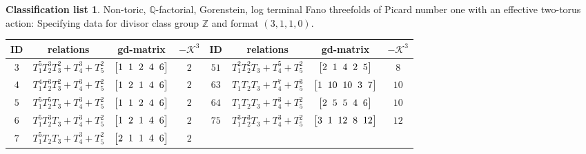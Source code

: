 \documentclass[10pt,a4paper]{amsart}
\theoremstyle{definition}
\newtheorem{class-list}[thm]{Classification list}
\def\ZZ{{\mathbb Z}}
\def\QQ{{\mathbb Q}}
\numberwithin{equation}{section}
\begin{document}
\begin{class-list}
Non-toric, $\QQ$-factorial, Gorenstein, log terminal Fano
threefolds of Picard number one with an effective two-torus action:
Specifying data for divisor class group $\ZZ$ and format $(3,1,1,0)$.
\begin{table}[h!]\centering\setlength{\tabcolsep}{3.5pt}
\renewcommand{\arraystretch}{1.25}\small\tabulinesep=1mm
\begin{tabu}{c|c|c|c||c|c|c|c}\hline
ID&relations&gd-matrix&$-\mathcal{K}^3$&ID&relations&gd-matrix&$-\mathcal{K}^3$
\\ \hline
${3}$&${T_{1}^{5}T_{2}^{3}T_{3}^{2}+T_{4}^{3}+T_{5}^{2}}$
&$\arraycolsep=1mm\begin{bmatrix} {1} & {1} & {2} & {4} & {6}\end{bmatrix}$&${2}$
&${51}$&${T_{1}^{2}T_{2}^{2}T_{3}+T_{4}^{5}+T_{5}^{2}}$
&$\arraycolsep=1mm\begin{bmatrix}{2} & {1} & {4} & {2} & {5}\end{bmatrix}$&${8}$
\\
\hline
${4}$&${T_{1}^{4}T_{2}^{3}T_{3}^{2}+T_{4}^{3}+T_{5}^{2}}$
&$\arraycolsep=1mm\begin{bmatrix}{1} & {2} & {1} & {4} & {6}\end{bmatrix}$&${2}$
&${63}$&${T_{1}T_{2}T_{3}+T_{4}^{7}+T_{5}^{3}}$
&$\arraycolsep=1mm\begin{bmatrix}{1} & {10} & {10} & {3} & {7}\end{bmatrix}$&${10}$
\\ \hline
${5}$&${T_{1}^{5}T_{2}^{5}T_{3}+T_{4}^{3}+T_{5}^{2}}$
&$\arraycolsep=1mm\begin{bmatrix}{1} & {1} & {2} & {4} & {6}\end{bmatrix}$&${2}$
&${64}$&${T_{1}T_{2}T_{3}+T_{4}^{3}+T_{5}^{2}}$
&$\arraycolsep=1mm\begin{bmatrix}{2} & {5} & {5} & {4} & {6}\end{bmatrix}$&${10}$
\\ \hline
${6}$&${T_{1}^{5}T_{2}^{3}T_{3}+T_{4}^{3}+T_{5}^{2}}$
&$\arraycolsep=1mm\begin{bmatrix}{1} & {2} & {1} & {4} & {6}\end{bmatrix}$&${2}$
&${75}$&${T_{1}^{3}T_{2}^{3}T_{3}+T_{4}^{3}+T_{5}^{2}}$
&$\arraycolsep=1mm\begin{bmatrix}{3} & {1} & {12} & {8} & {12}\end{bmatrix}$&${12}$
\\ \hline
${7}$&${T_{1}^{5}T_{2}T_{3}+T_{4}^{3}+T_{5}^{2}}$
&$\arraycolsep=1mm\begin{bmatrix}{2} & {1} & {1} & {4} & {6}\end{bmatrix}$&${2}$

\end{tabu}
\end{table}
\end{class-list}
\end{document}

